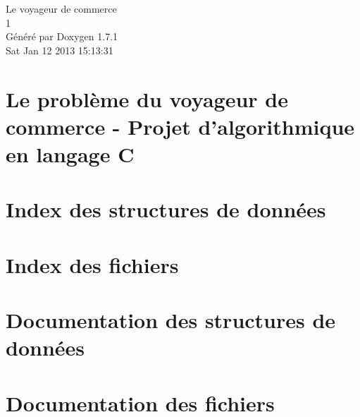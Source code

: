 \documentclass[a4paper]{book}
\begin{document}
\hypersetup{pageanchor=false}
\begin{titlepage}
\vspace*{7cm}
\begin{center}
{\Large Le voyageur de commerce \\[1ex]\large 1 }\\
\vspace*{1cm}
{\large Généré par Doxygen 1.7.1}\\
\vspace*{0.5cm}
{\small Sat Jan 12 2013 15:13:31}\\
\end{center}
\end{titlepage}
\clearemptydoublepage
{}
\tableofcontents
\clearemptydoublepage
{}
\hypersetup{pageanchor=true}
\chapter{Le problème du voyageur de commerce -\/ Projet d'algorithmique en langage C}
\label{index}\hypertarget{index}{}
\chapter{Index des structures de données}

\chapter{Index des fichiers}

\chapter{Documentation des structures de données}







\chapter{Documentation des fichiers}






















\printindex
\end{document}
